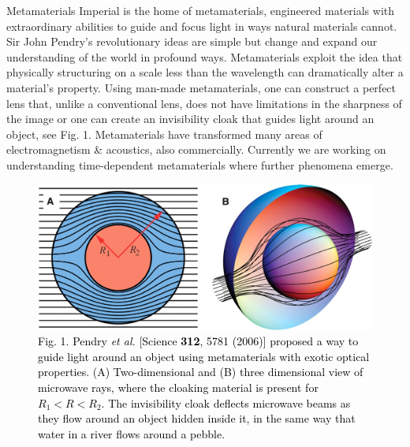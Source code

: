 \documentclass[xcolor={table}]{beamer}
\begin{document}
\begin{frame}[fragile=singleslide,t]
\begin{columns}[onlytextwidth,T]
\begin{column}{.47\textwidth}
\begin{block}{Metamaterials}
Imperial is the home of metamaterials, engineered materials with extraordinary abilities to guide and focus light in ways natural materials cannot. Sir John Pendry's revolutionary ideas are simple but change and expand our understanding of the world in profound ways. Metamaterials exploit the idea that physically structuring on a scale less than the wavelength can dramatically alter a material’s property. Using man-made metamaterials, one can construct a perfect lens that, unlike a conventional lens, does not have limitations in the sharpness of the image or one can  create an invisibility cloak that guides light around an object, see Fig. 1. Metamaterials have transformed many areas of electromagnetism \& acoustics,  also commercially. Currently we are working on understanding time-dependent metamaterials where further phenomena emerge.
\end{block}
\vspace*{-1.5cm}
\begin{figure}
\centering
    \includegraphics[width=0.9\columnwidth]{Cloak.jpeg}
    \caption{\footnotesize \textcolor{black}{Fig. 1. Pendry {\it \footnotesize et al.} [Science {\bf \footnotesize 312}, 5781 (2006)] proposed a way to guide light around an object using metamaterials with exotic optical properties. (A) Two-dimensional and (B) three dimensional view of microwave rays, where the cloaking material is present for $R_1 < R < R_2$. The invisibility cloak deflects microwave beams as they flow around an object hidden inside it, in the same way that water in a river flows around a pebble.}}
\end{figure}


\end{column}
\end{columns}
\end{frame}
\end{document}
